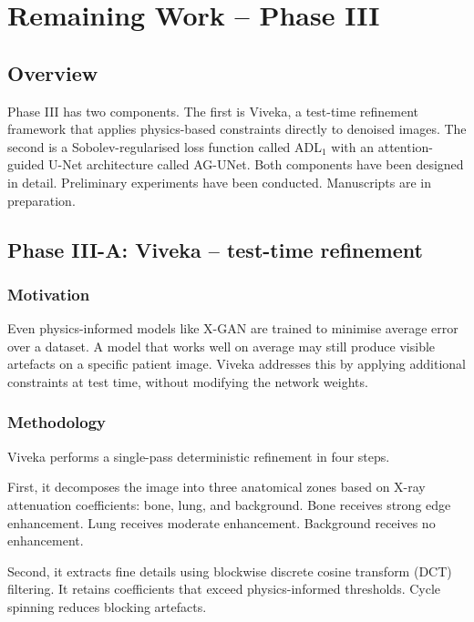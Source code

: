 
\section{Remaining Work – Phase III}
\label{sec:phase3}
\subsection{Overview}

Phase III has two components. The first is Viveka, a test-time refinement framework that applies physics-based constraints directly to denoised images. The second is a Sobolev-regularised loss function called ADL\(_1\) with an attention-guided U-Net architecture called AG-UNet. Both components have been designed in detail. Preliminary experiments have been conducted. Manuscripts are in preparation.

\subsection{Phase III-A: Viveka – test-time refinement}

\subsubsection{Motivation}

Even physics-informed models like X-GAN are trained to minimise average error over a dataset. A model that works well on average may still produce visible artefacts on a specific patient image. Viveka addresses this by applying additional constraints at test time, without modifying the network weights.

\subsubsection{Methodology}

Viveka performs a single-pass deterministic refinement in four steps.

First, it decomposes the image into three anatomical zones based on X-ray attenuation coefficients: bone, lung, and background. Bone receives strong edge enhancement. Lung receives moderate enhancement. Background receives no enhancement.

Second, it extracts fine details using blockwise discrete cosine transform (DCT) filtering. It retains coefficients that exceed physics-informed thresholds. Cycle spinning reduces blocking artefacts.

